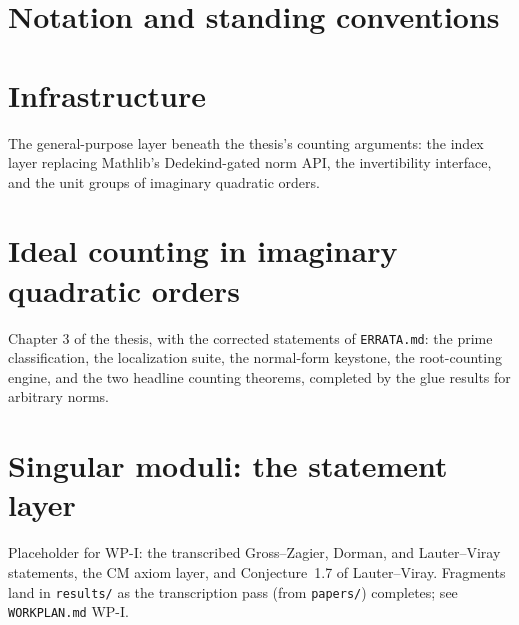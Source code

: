 
\chapter{Notation and standing conventions}\label{ch:notation}



\chapter{Infrastructure}\label{ch:infrastructure}

The general-purpose layer beneath the thesis's counting arguments: the index
layer replacing Mathlib's Dedekind-gated norm API, the invertibility
interface, and the unit groups of imaginary quadratic orders.





\chapter{Ideal counting in imaginary quadratic orders}\label{ch:counting}

Chapter 3 of the thesis, with the corrected statements of \texttt{ERRATA.md}:
the prime classification, the localization suite, the normal-form keystone,
the root-counting engine, and the two headline counting theorems, completed
by the glue results for arbitrary norms.












\chapter{Singular moduli: the statement layer}\label{ch:singular-moduli}

Placeholder for WP-I: the transcribed Gross--Zagier, Dorman, and
Lauter--Viray statements, the CM axiom layer, and Conjecture~1.7 of
Lauter--Viray. Fragments land in \texttt{results/} as the transcription pass
(from \texttt{papers/}) completes; see \texttt{WORKPLAN.md} WP-I.
